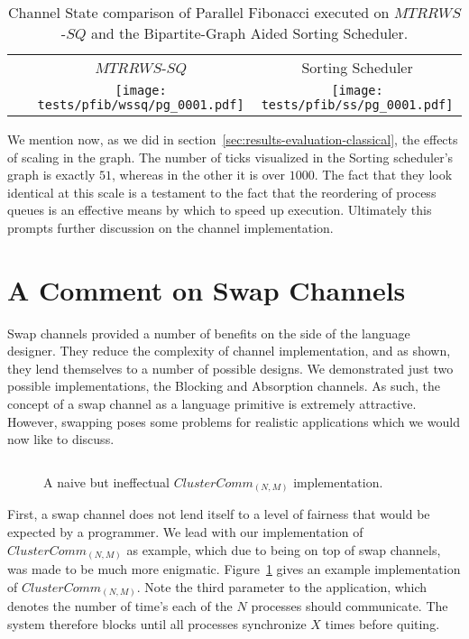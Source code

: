 \begin{table}[tp!]
    \centering
    \begin{tabular}{@{}ccc}
    & $MTRRWS$-$SQ$ & Sorting Scheduler  \\ \cline{2-3} 
        \multicolumn{1}{c|}{~}  & 
    \multicolumn{1}{c|}{\texttt{[image: tests/pfib/wssq/pg\_0001.pdf]}} & 
    \multicolumn{1}{c|}{\texttt{[image: tests/pfib/ss/pg\_0001.pdf]}} \\ \cline{2-3}
\end{tabular}
\caption{Channel State comparison of Parallel Fibonacci executed on $MTRRWS$-$SQ$ 
    and the Bipartite-Graph Aided Sorting Scheduler. }
    \label{tab:ss-compare-fib}
\end{table}

We mention now, as we did in section~\ref{sec:results-evaluation-classical},
the effects of scaling in the graph. The number of ticks visualized in the 
Sorting scheduler's graph is exactly $51$, whereas in the other it is over
$1000$. The fact that they look identical at this scale is a testament to the
fact that the reordering of process queues is an effective means by which to
speed up execution. Ultimately this prompts further discussion on the channel
implementation.

\section{A Comment on Swap Channels}\label{sec:results-swap-channels}

Swap channels provided a number of benefits on the side of the language 
designer. They reduce the complexity of channel implementation, and as shown, 
they lend themselves to a number of possible designs. We demonstrated just two 
possible implementations, the Blocking and Absorption channels. As such, the 
concept of a swap channel as a language primitive is extremely attractive. 
However, swapping poses some problems for realistic applications which we would
now like to discuss.

\begin{figure}[tp!]
\centering
\inputminted[frame=lines,fontsize=\footnotesize]{csharp}{code/badclustercomm.els}
\caption{A naive but ineffectual $ClusterComm_{(N,M)}$ implementation.} 
\label{fig:bad-clustercomm}
\end{figure}

First, a swap channel does not lend itself to a level of fairness that would be
expected by a programmer. We lead with our implementation of 
$ClusterComm_{(N,M)}$ as example, which due to being on top of swap channels, 
was made to be much more enigmatic. Figure~\ref{fig:bad-clustercomm} gives an
example implementation of $ClusterComm_{(N,M)}$. Note the third parameter to
the application, which denotes the number of time's each of the $N$ processes
should communicate. The system therefore blocks until all processes synchronize
$X$ times before quiting.

